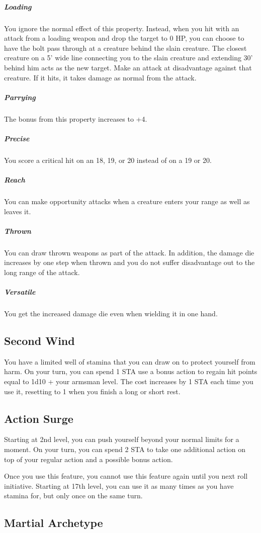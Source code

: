 \subparagraph*{Loading} You ignore the normal effect of this property. Instead, when you hit with an attack from a loading weapon and drop the target to 0 HP, you can choose to have the bolt pass through at a creature behind the slain creature. The closest creature on a 5' wide line connecting you to the slain creature and extending 30' behind him acts as the new target. Make an attack at disadvantage against that creature. If it hits, it takes damage as normal from the attack.

\subparagraph*{Parrying} The bonus from this property increases to +4.

\subparagraph*{Precise} You score a critical hit on an 18, 19, or 20 instead of on a 19 or 20.

\subparagraph*{Reach} You can make opportunity attacks when a creature enters your range as well as leaves it.

\subparagraph*{Thrown} You can draw thrown weapons as part of the attack. In addition, the damage die increases by one step when thrown and you do not suffer disadvantage out to the long range of the attack.

\subparagraph*{Versatile} You get the increased damage die even when wielding it in one hand.

\subsection{Second Wind}

You have a limited well of stamina that you can draw on to protect yourself from harm. On your turn, you can spend 1 STA use a bonus action to regain hit points equal to 1d10 + your armsman level. The cost increases by 1 STA each time you use it, resetting to 1 when you finish a long or short rest.

\subsection{Action Surge}

Starting at 2nd level, you can push yourself beyond your normal limits for a moment. On your turn, you can spend 2 STA to take one additional action on top of your regular action and a possible bonus action.

Once you use this feature, you cannot use this feature again until you next roll initiative. Starting at 17th level, you can use it as many times as you have stamina for, but only once on the same turn.

\subsection{Martial Archetype}

